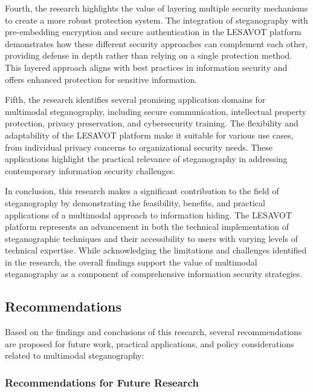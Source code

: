 \documentclass[12pt, a4paper, oneside]{book}
\begin{document}
Fourth, the research highlights the value of layering multiple security mechanisms to create a more robust protection system. The integration of steganography with pre-embedding encryption and secure authentication in the LESAVOT platform demonstrates how these different security approaches can complement each other, providing defense in depth rather than relying on a single protection method. This layered approach aligns with best practices in information security and offers enhanced protection for sensitive information.

Fifth, the research identifies several promising application domains for multimodal steganography, including secure communication, intellectual property protection, privacy preservation, and cybersecurity training. The flexibility and adaptability of the LESAVOT platform make it suitable for various use cases, from individual privacy concerns to organizational security needs. These applications highlight the practical relevance of steganography in addressing contemporary information security challenges.

In conclusion, this research makes a significant contribution to the field of steganography by demonstrating the feasibility, benefits, and practical applications of a multimodal approach to information hiding. The LESAVOT platform represents an advancement in both the technical implementation of steganographic techniques and their accessibility to users with varying levels of technical expertise. While acknowledging the limitations and challenges identified in the research, the overall findings support the value of multimodal steganography as a component of comprehensive information security strategies.

\subsection{Recommendations}

Based on the findings and conclusions of this research, several recommendations are proposed for future work, practical applications, and policy considerations related to multimodal steganography:

\subsubsection{Recommendations for Future Research}
\end{document}
